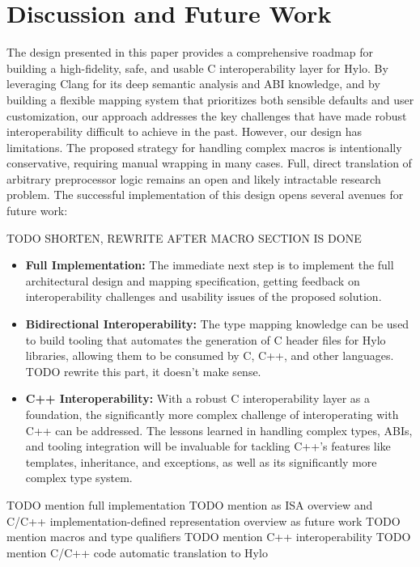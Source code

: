 \section{Discussion and Future Work}

The design presented in this paper provides a comprehensive roadmap for building a high-fidelity, safe, and usable C interoperability layer for Hylo. By leveraging Clang for its deep semantic analysis and ABI knowledge, and by building a flexible mapping system that prioritizes both sensible defaults and user customization, our approach addresses the key challenges that have made robust interoperability difficult to achieve in the past.
However, our design has limitations. The proposed strategy for handling complex macros is intentionally conservative, requiring manual wrapping in many cases. Full, direct translation of arbitrary preprocessor logic remains an open and likely intractable research problem.
The successful implementation of this design opens several avenues for future work:


TODO SHORTEN, REWRITE AFTER MACRO SECTION IS DONE
\begin{itemize}
    \item \textbf{Full Implementation:} The immediate next step is to implement the full architectural design and mapping specification, getting feedback on interoperability challenges and usability issues of the proposed solution.
    \item \textbf{Bidirectional Interoperability:} The type mapping knowledge can be used to build tooling that automates the generation of C header files for Hylo libraries, allowing them to be consumed by C, C++, and other languages. TODO rewrite this part, it doesn't make sense.
    \item \textbf{C++ Interoperability:} With a robust C interoperability layer as a foundation, the significantly more complex challenge of interoperating with C++ can be addressed. The lessons learned in handling complex types, ABIs, and tooling integration will be invaluable for tackling C++'s features like templates, inheritance, and exceptions, as well as its significantly more complex type system.
\end{itemize}

TODO mention full implementation
TODO mention as ISA overview and C/C++ implementation-defined representation overview as future work
TODO mention macros and type qualifiers
TODO mention C++ interoperability
TODO mention C/C++ code automatic translation to Hylo